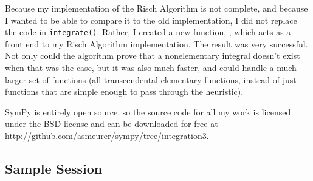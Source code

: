 Because my implementation of the Risch Algorithm is not complete, and
because I wanted to be able to compare it to the old implementation, I
did not replace the code in \texttt{integrate()}.  Rather, I created a
new function, \rischintegrate{}, which acts as a front end to my Risch
Algorithm implementation.  The result was very successful.  Not only
could the algorithm prove that a nonelementary integral doesn't exist
when that was the case, but it was also much faster, and could handle a
much larger set of functions (all \gls{transcendental} \gls{elementary}
functions, instead of just functions that are simple enough to pass
through the heuristic).  

SymPy is entirely open source, so the source code for all my work
is licensed under the BSD license and can be downloaded for free at
\url{http://github.com/asmeurer/sympy/tree/integration3}.

\subsection{Sample Session} 
\label{sample}

